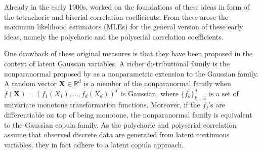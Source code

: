 Already in the early 1900s, \citet{Pearson1900,Pearson13} worked on the foundations of these ideas in form of the tetrachoric and biserial correlation coefficients. From these arose the maximum likelihood estimators (MLEs) for the general version of these early ideas, namely the polychoric and the polyserial correlation coefficients. 


One drawback of these original measures is that they have been proposed in the context of latent Gaussian variables.
A richer distributional family is the nonparanormal proposed by \citet{Liu09} as a nonparametric extension to the Gaussian family. A random vector $\boldsymbol{X} \in \mathbb{R}^d$ is a member of the nonparanormal family when $f(\boldsymbol{X}) = (f_{1}(X_{1}), \dots, f_{d}(X_{d}))^{T}$ is Gaussian, where $\{f_{k}\}_{k=1}^{d}$ is a set of univariate monotone transformation functions. Moreover, if the $f_j$'s are differentiable on top of being monotone, the nonparanormal family is equivalent to the Gaussian copula family. As the polychoric and polyserial correlation assume that observed discrete data are generated from latent continuous variables, they 
in fact adhere to a latent copula approach.


